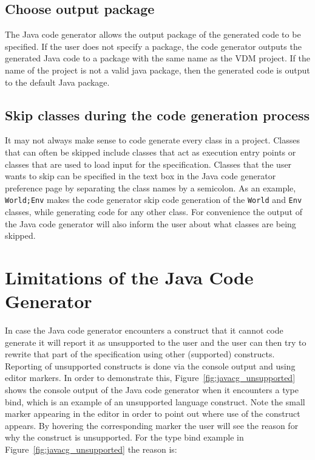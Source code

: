 \subsection{Choose output package}

The Java code generator allows the output package of the generated
code to be specified. If the user does not specify a package, the code
generator outputs the generated Java code to a package with the same
name as the VDM project. If the name of the project is not a valid
java package, then the generated code is output to the default Java
package.

\subsection{Skip classes during the code generation process}

It may not always make sense to code generate every class in a
project. Classes that can often be skipped include classes that act as
execution entry points or classes that are used to load input for the
specification. Classes that the user wants to skip can be specified in
the text box in the Java code generator preference page by separating
the class names by a semicolon. As an example, \texttt{World;Env}
makes the code generator skip code generation of the \texttt{World}
and \texttt{Env} classes, while generating code for any other
class. For convenience the output of the Java code generator will also
inform the user about what classes are being skipped.

\section{Limitations of the Java Code Generator}

In case the Java code generator encounters a construct that it cannot
code generate it will report it as unsupported to the user and the
user can then try to rewrite that part of the specification using
other (supported) constructs. Reporting of unsupported constructs is
done via the console output and using editor markers. In order to
demonstrate this, Figure~\ref{fig:javacg_unsupported} shows the
console output of the Java code generator when it encounters a type
bind, which is an example of an unsupported language construct. Note
the small marker appearing in the editor in order to point out where
use of the construct appears. By hovering the corresponding marker the
user will see the reason for why the construct is unsupported. For the
type bind example in Figure~\ref{fig:javacg_unsupported} the reason
is:\\

